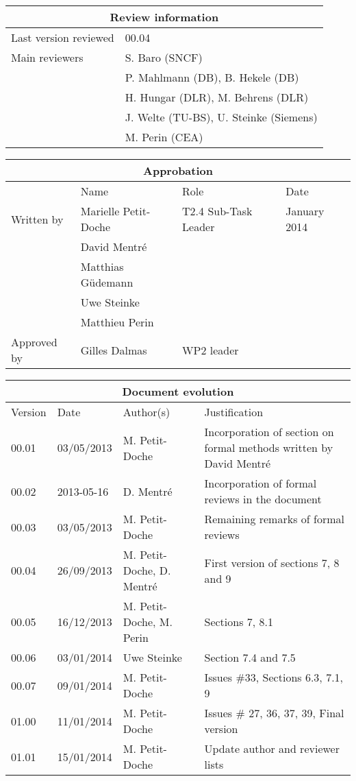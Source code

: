 \documentclass{template/openetcs_article}
\begin{document}
\begin{tabular}{|p{4.4cm}|p{8.7cm}|}
\hline
\multicolumn{2}{|c|}{Review information} \\
\hline
Last version reviewed & 00.04 \\
\hline
Main reviewers & S. Baro (SNCF) \\
& P. Mahlmann (DB), B. Hekele (DB)\\
& H. Hungar (DLR), M. Behrens (DLR) \\
& J. Welte (TU-BS), U. Steinke (Siemens) \\
& M. Perin (CEA) \\
\hline
\end{tabular}

\begin{tabular}{|p{2.2cm}|p{4cm}|p{4cm}|p{2cm}|}
\hline
\multicolumn{4}{|c|}{Approbation} \\
\hline
  &  Name & Role & Date   \\
\hline  
Written by    &  Marielle Petit-Doche & T2.4 Sub-Task Leader  & January 2014 \\
& David Mentré & & \\
& Matthias Güdemann & & \\
& Uwe Steinke & & \\
& Matthieu Perin & & \\
\hline
Approved by & Gilles Dalmas & WP2 leader & \\
\hline
\end{tabular}

\begin{tabular}{|p{2.2cm}|p{2cm}|p{3cm}|p{5cm}|}
\hline
\multicolumn{4}{|c|}{Document evolution} \\
\hline
Version &  Date & Author(s) & Justification  \\
\hline  
00.01 & 03/05/2013 & M. Petit-Doche &  Incorporation of section on formal methods written by David Mentré \\
\hline  
00.02 & 2013-05-16 & D. Mentré &  Incorporation of formal reviews in
the document \\
\hline  
00.03 & 03/05/2013 & M. Petit-Doche &  Remaining remarks of formal reviews \\
\hline  
00.04 & 26/09/2013 & M. Petit-Doche, D. Mentré & First version of sections 7, 8 and 9   \\
\hline  
00.05 & 16/12/2013 & M. Petit-Doche, M. Perin & Sections 7, 8.1  \\
\hline  
00.06 & 03/01/2014 & Uwe Steinke & Section 7.4 and 7.5  \\
\hline  
00.07 & 09/01/2014 & M. Petit-Doche & Issues \#33, Sections 6.3, 7.1, 9  \\
\hline  
01.00 & 11/01/2014 & M. Petit-Doche & Issues \# 27, 36, 37, 39, Final version  \\
\hline  
01.01 & 15/01/2014 & M. Petit-Doche & Update author and reviewer lists  \\
\hline  
\end{tabular}
\end{document}
